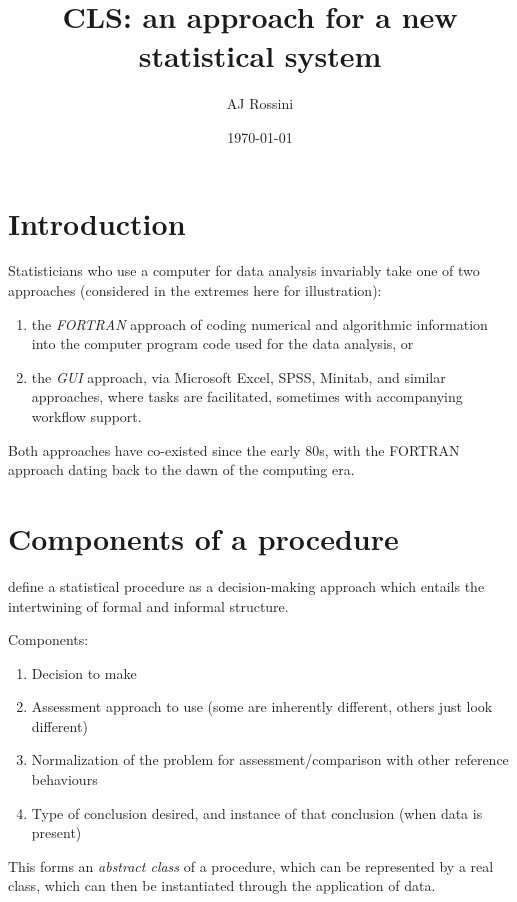 \documentclass{article}
\title{CLS: an approach for a new statistical system}
\author{AJ Rossini}
\date{\today}
\begin{document}
\maketitle

\section{Introduction}
\label{sec:intro}

Statisticians who use a computer for data analysis invariably take one
of two approaches (considered in the extremes here for illustration): 
\begin{enumerate}
\item the \emph{FORTRAN} approach of coding numerical and algorithmic
  information into the computer program code used for the data
  analysis, or 
\item the \emph{GUI} approach, via Microsoft Excel, SPSS, Minitab, and
  similar approaches, where tasks are facilitated, sometimes with
  accompanying workflow support.
\end{enumerate}
Both approaches have co-existed since the early 80s, with the FORTRAN
approach dating back to the dawn of the computing era.

\section{Components of a procedure}
\label{sec:components}

define a statistical procedure as a decision-making approach which
entails the intertwining of formal and informal structure.   

Components:
\begin{enumerate}
\item \label{statproc-decision} Decision to make
\item \label{statproc-assessment} Assessment approach to use
  (some are inherently different, others just look different)
\item \label{statproc-normalization} Normalization of the problem for
  assessment/comparison with other reference behaviours
\item \label{conclusion} Type of conclusion desired, and instance of
  that conclusion (when data is present)
\end{enumerate}

This forms an \textit{abstract class} of a procedure, which can be
represented by a real class, which can then be instantiated through
the application of data.
\end{document}
